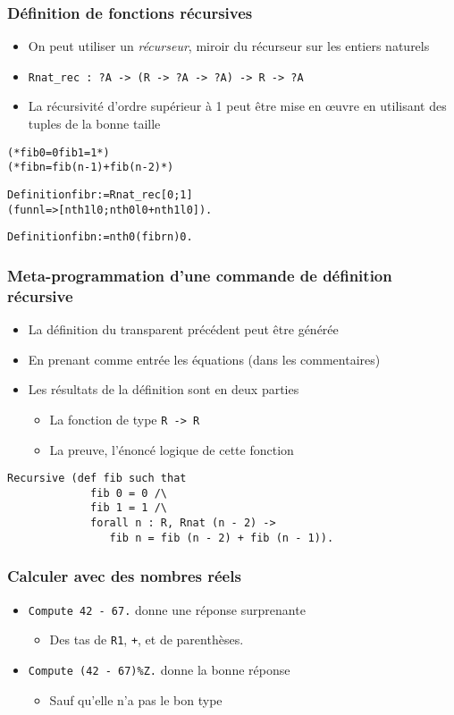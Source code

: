 \documentclass[compress]{beamer}
\begin{document}
\begin{frame}[fragile]
\frametitle{D\'efinition de fonctions r\'ecursives}
\begin{itemize}
\item On peut utiliser un {\em r\'ecurseur}, miroir du r\'ecurseur sur les entiers naturels
\item {\tt Rnat\_rec : ?A -> (R -> ?A -> ?A) -> R -> ?A}
\item La r\'ecursivit\'e d'ordre sup\'erieur \`a 1 peut \^etre mise en \oe{}uvre en utilisant des tuples de la bonne taille
\end{itemize}
\begin{small}
\begin{alltt}
(* fib 0 = 0  fib 1 = 1              *)
(* fib n = fib (n - 1) + fib (n - 2) *)

Definition fibr := Rnat_rec [0; 1]
   (fun n l => [nth 1 l 0; nth 0 l 0 + nth 1 l 0]).

Definition fib n := nth 0 (fibr n) 0. 
\end{alltt}
\end{small}%
\end{frame}
\begin{frame}[fragile]
\frametitle{Meta-programmation d'une commande de d\'efinition r\'ecursive}
\begin{itemize}
\item La d\'efinition du transparent pr\'ec\'edent peut \^etre g\'en\'er\'ee
\item En prenant comme entr\'ee les \'equations (dans les commentaires)
\item Les r\'esultats de la d\'efinition sont en deux parties
\begin{itemize}
\item La fonction de type {\tt R -> R}
\item La preuve, l'\'enonc\'e logique de cette fonction
\end{itemize}
\end{itemize}
\begin{small}
\begin{verbatim}
Recursive (def fib such that
             fib 0 = 0 /\
             fib 1 = 1 /\
             forall n : R, Rnat (n - 2) ->
                fib n = fib (n - 2) + fib (n - 1)).
\end{verbatim}
\end{small}
\end{frame}
\begin{frame}
\frametitle{Calculer avec des nombres r\'eels}
\begin{itemize}
\item {\tt Compute 42 - 67.} donne une r\'eponse surprenante
\begin{itemize}
\item Des tas de {\tt R1}, {\tt +}, {\tt *} et de parenth\`eses.
\end{itemize}
\item {\tt Compute (42 - 67)\%Z.} donne la bonne r\'eponse
\begin{itemize}
\item  Sauf qu'elle n'a pas le bon type
\end{itemize}
\end{itemize}
\end{frame}
\end{document}
